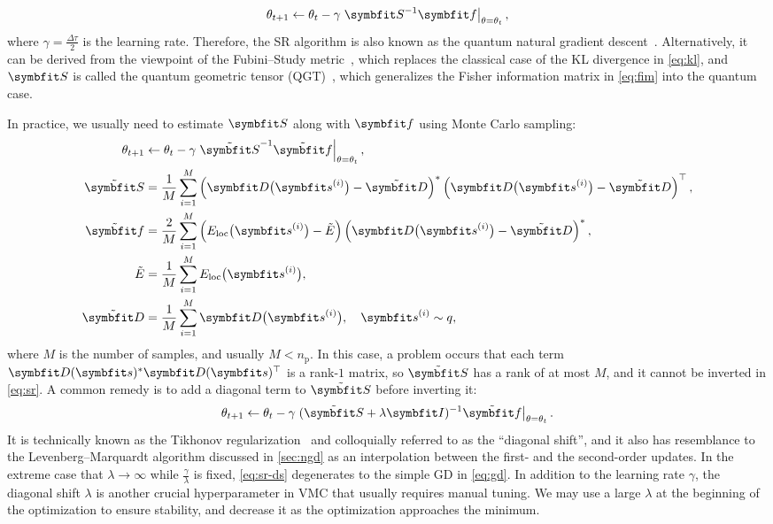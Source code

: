 \begin{equation}
\theta_{t + 1} \gets \theta_t - \gamma \left. \mS^{-1} \vf \right|_{\theta = \theta_t},
\label{eq:sr}
\end{equation}
where $\gamma = \frac{\Delta \tau}{2}$ is the learning rate. Therefore, the SR algorithm is also known as the quantum natural gradient descent~\cite{stokes2020quantum}. Alternatively, it can be derived from the viewpoint of the Fubini--Study metric~\cite{study1905kurzeste}, which replaces the classical case of the KL divergence in \cref{eq:kl}, and $\mS$ is called the quantum geometric tensor (QGT)~\cite{berry1989quantum}, which generalizes the Fisher information matrix in \cref{eq:fim} into the quantum case.

In practice, we usually need to estimate $\mS$ along with $\vf$ using Monte Carlo sampling:
\begin{align}
\theta_{t + 1} &\gets \theta_t - \gamma \left. \tilde{\mS}^{-1} \tilde{\vf} \right|_{\theta = \theta_t}, \\
\tilde{\mS} &= \frac{1}{M} \sum_{i = 1}^M
\left( \vD\big( \vs^{(i)} \big) - \tilde{\vD} \right)^*
\left( \vD\big( \vs^{(i)} \big) - \tilde{\vD} \right)^\transpose, \label{eq:qgt-mc} \\
\tilde{\vf} &= \frac{2}{M} \sum_{i = 1}^M
\left( E_\text{loc}\big( \vs^{(i)} \big) - \tilde{E} \right)
\left( \vD\big( \vs^{(i)} \big) - \tilde{\vD} \right)^*, \\
\tilde{E} &= \frac{1}{M} \sum_{i = 1}^M E_\text{loc}\big( \vs^{(i)} \big), \\
\tilde{\vD} &= \frac{1}{M} \sum_{i = 1}^M \vD\big( \vs^{(i)} \big), \quad
\vs^{(i)} \sim q,
\end{align}
where $M$ is the number of samples, and usually $M < n_\text{p}$. In this case, a problem occurs that each term $\vD(\vs)^* \vD(\vs)^\transpose$ is a rank-$1$ matrix, so $\tilde{\mS}$ has a rank of at most $M$, and it cannot be inverted in \cref{eq:sr}. A common remedy is to add a diagonal term to $\tilde{\mS}$ before inverting it:
\begin{equation}
\theta_{t + 1} \gets \theta_t - \gamma \left. (\tilde{\mS} + \lambda \mI)^{-1} \tilde{\vf} \right|_{\theta = \theta_t}.
\label{eq:sr-ds}
\end{equation}
It is technically known as the Tikhonov regularization~\cite{tikhonov1943stability} and colloquially referred to as the ``diagonal shift'', and it also has resemblance to the Levenberg--Marquardt algorithm discussed in \cref{sec:ngd} as an interpolation between the first- and the second-order updates. In the extreme case that $\lambda \to \infty$ while $\frac{\gamma}{\lambda}$ is fixed, \cref{eq:sr-ds} degenerates to the simple GD in \cref{eq:gd}. In addition to the learning rate $\gamma$, the diagonal shift $\lambda$ is another crucial hyperparameter in VMC that usually requires manual tuning. We may use a large $\lambda$ at the beginning of the optimization to ensure stability, and decrease it as the optimization approaches the minimum.

